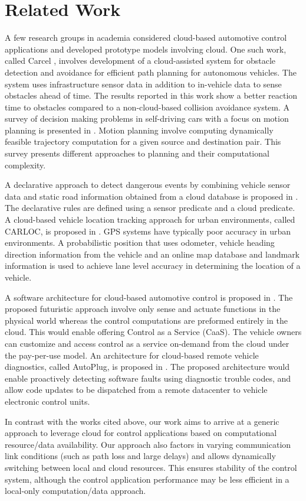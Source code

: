 \section{Related Work}
\label{sec:related.date17}
A few research groups in academia considered cloud-based automotive control applications and developed prototype models involving cloud. One such work, called Carcel \cite{ref:cloud_mit}, involves development of a cloud-assisted system for obstacle detection and avoidance for efficient path planning for autonomous vehicles. The system uses infrastructure sensor data in addition to in-vehicle data to sense obstacles ahead of time. The results reported in this work show a better reaction time to obstacles compared to a non-cloud-based collision avoidance system. A survey of decision making problems in self-driving cars with a focus on motion planning is presented in \cite{ref:motionplan_survey}. Motion planning involve computing dynamically feasible trajectory computation for a given source and destination pair. This survey presents different approaches to planning and their computational complexity.

A declarative approach to detect dangerous events by combining vehicle sensor data and static road information obtained from a cloud database is proposed in \cite{ref:carlog}. The declarative rules are defined using a sensor predicate and a cloud predicate. A cloud-based vehicle location tracking approach for urban environments, called CARLOC, is proposed in \cite{ref:carloc}. GPS systems have typically poor accuracy in urban environments. A probabilistic position that uses odometer, vehicle heading direction information from the vehicle and an online map database and landmark information is used to achieve lane level accuracy in determining the location of a vehicle. 

A software architecture for cloud-based automotive control is proposed in \cite{ref:caas}. The proposed futuristic approach involve only sense and actuate functions in the physical world whereas the control computations are preformed entirely in the cloud. This would enable offering Control as a Service (CaaS). The vehicle owners can customize and access control as a service on-demand from the cloud under the pay-per-use model. An architecture for cloud-based remote vehicle diagnostics, called AutoPlug, is proposed in \cite{ref:car_cloud}. The proposed architecture would enable proactively detecting software faults using diagnostic trouble codes, and allow code updates to be dispatched from a remote datacenter to vehicle electronic control units.

In contrast with the works cited above, our work aims to arrive at a generic approach to leverage cloud for control applications based on computational resource/data availability. Our approach also factors in varying communication link conditions (such as path loss and large delays) and allows dynamically switching between local and cloud resources. This ensures stability of the control system, although the control application performance may be less efficient in a local-only computation/data approach.